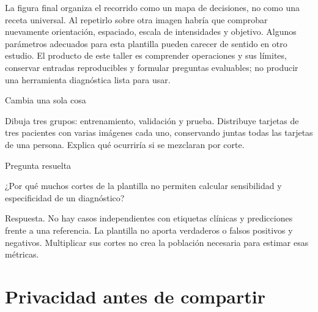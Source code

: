 


La figura final organiza el recorrido como un mapa de decisiones, no como una receta universal. Al repetirlo sobre otra imagen habría que comprobar nuevamente orientación, espaciado, escala de intensidades y objetivo. Algunos parámetros adecuados para esta plantilla pueden carecer de sentido en otro estudio. El producto de este taller es comprender operaciones y sus límites, conservar entradas reproducibles y formular preguntas evaluables; no producir una herramienta diagnóstica lista para usar.



\begin{Practica}{Cambia una sola cosa}

Dibuja tres grupos: entrenamiento, validación y prueba. Distribuye tarjetas de tres pacientes con varias imágenes cada uno, conservando juntas todas las tarjetas de una persona. Explica qué ocurriría si se mezclaran por corte.


\end{Practica}


\begin{Idea}{Pregunta resuelta}

¿Por qué muchos cortes de la plantilla no permiten calcular sensibilidad y especificidad de un diagnóstico?


Respuesta. No hay casos independientes con etiquetas clínicas y predicciones frente a una referencia. La plantilla no aporta verdaderos o falsos positivos y negativos. Multiplicar sus cortes no crea la población necesaria para estimar esas métricas.


\end{Idea}

\appendix

\chapter[Privacidad]{Privacidad antes de compartir}

